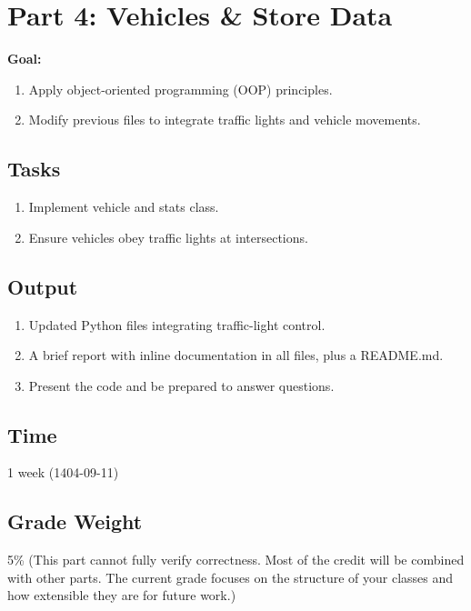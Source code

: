 \documentclass{KPS_assignment}
\begin{document}
\maketitle
\section*{Part 4: Vehicles \& Store Data}

\textbf{Goal:}
\begin{enumerate}
\item Apply object-oriented programming (OOP) principles.
\item Modify previous files to integrate traffic lights and vehicle movements.
\end{enumerate}

\subsection*{Tasks}
\begin{enumerate}
    \item Implement vehicle and stats class.
    \item Ensure vehicles obey traffic lights at intersections.
\end{enumerate}

\subsection*{Output}
\begin{enumerate}
\item Updated Python files integrating traffic-light control.
\item A brief report with inline documentation in all files, plus a README.md.
\item Present the code and be prepared to answer questions.
\end{enumerate}

\subsection*{Time}
1 week (1404-09-11)

\subsection*{Grade Weight}
5\% (This part cannot fully verify correctness. Most of the credit will be combined with other parts. The current grade focuses on the structure of your classes and how extensible they are for future work.)
\end{document}
